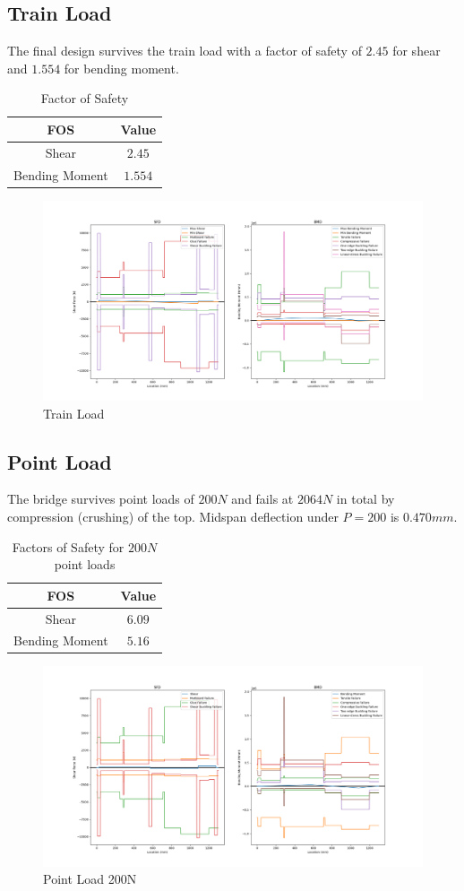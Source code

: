 \documentclass[11pt,twocolumn,letterpaper]{article}
\begin{document}
\subsection*{Train Load}
The final design survives the train load with a factor of safety of $2.45$ for shear and $1.554$ for bending moment.

\begin{table}[h]
\begin{center}
\begin{tabular}{|cc|} 
\hline
\multicolumn{1}{|c}{FOS} & \multicolumn{1}{c|}{Value} \\
\hline
Shear &   $2.45$ \\
Bending Moment &   $1.554$ \\
\hline
\end{tabular}
\caption{Factor of Safety}
\end{center}
\end{table}

\begin{figure}[h!]
  \centering
    \includegraphics[width=.4\textwidth]{figures/SBTrainload.png}
    \caption {Train Load}
  \hfill
\end{figure}
\newpage
\subsection*{Point Load}
The bridge survives point loads of $200\si{N}$ and fails at $2064\si{N}$ in total by compression (crushing) of the top.
Midspan deflection under $P = 200$ is $0.470\si{mm}$.
\begin{table}[h]
\begin{center}
\begin{tabular}{|cc|} 
\hline
\multicolumn{1}{|c}{FOS} & \multicolumn{1}{c|}{Value} \\
\hline
Shear &   $6.09$ \\
Bending Moment &   $5.16$ \\
\hline
\end{tabular}
\caption{Factors of Safety for $200\si{N}$ point loads}
\end{center}
\end{table}

\begin{figure}[ht!]
  \centering
    \includegraphics[width=.4\textwidth]{figures/SBPoint200.png}
    \caption {Point Load 200N}
  \hfill
\end{figure}
\end{document}
